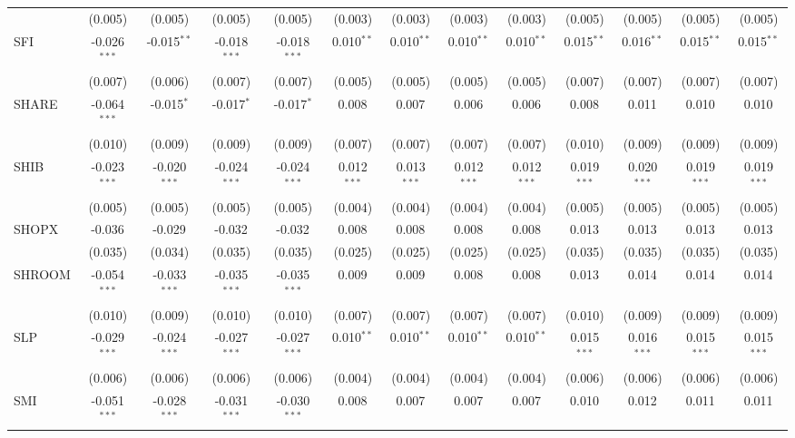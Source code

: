 \begin{table}[!htbp]
\begin{tabular}{@{\extracolsep{5pt}}lcccccccccccc}
  & (0.005) & (0.005) & (0.005) & (0.005) & (0.003) & (0.003) & (0.003) & (0.003) & (0.005) & (0.005) & (0.005) & (0.005) \\
 SFI & -0.026$^{***}$ & -0.015$^{**}$ & -0.018$^{***}$ & -0.018$^{***}$ & 0.010$^{**}$ & 0.010$^{**}$ & 0.010$^{**}$ & 0.010$^{**}$ & 0.015$^{**}$ & 0.016$^{**}$ & 0.015$^{**}$ & 0.015$^{**}$ \\
  & (0.007) & (0.006) & (0.007) & (0.007) & (0.005) & (0.005) & (0.005) & (0.005) & (0.007) & (0.007) & (0.007) & (0.007) \\
 SHARE & -0.064$^{***}$ & -0.015$^{*}$ & -0.017$^{*}$ & -0.017$^{*}$ & 0.008$^{}$ & 0.007$^{}$ & 0.006$^{}$ & 0.006$^{}$ & 0.008$^{}$ & 0.011$^{}$ & 0.010$^{}$ & 0.010$^{}$ \\
  & (0.010) & (0.009) & (0.009) & (0.009) & (0.007) & (0.007) & (0.007) & (0.007) & (0.010) & (0.009) & (0.009) & (0.009) \\
 SHIB & -0.023$^{***}$ & -0.020$^{***}$ & -0.024$^{***}$ & -0.024$^{***}$ & 0.012$^{***}$ & 0.013$^{***}$ & 0.012$^{***}$ & 0.012$^{***}$ & 0.019$^{***}$ & 0.020$^{***}$ & 0.019$^{***}$ & 0.019$^{***}$ \\
  & (0.005) & (0.005) & (0.005) & (0.005) & (0.004) & (0.004) & (0.004) & (0.004) & (0.005) & (0.005) & (0.005) & (0.005) \\
 SHOPX & -0.036$^{}$ & -0.029$^{}$ & -0.032$^{}$ & -0.032$^{}$ & 0.008$^{}$ & 0.008$^{}$ & 0.008$^{}$ & 0.008$^{}$ & 0.013$^{}$ & 0.013$^{}$ & 0.013$^{}$ & 0.013$^{}$ \\
  & (0.035) & (0.034) & (0.035) & (0.035) & (0.025) & (0.025) & (0.025) & (0.025) & (0.035) & (0.035) & (0.035) & (0.035) \\
 SHROOM & -0.054$^{***}$ & -0.033$^{***}$ & -0.035$^{***}$ & -0.035$^{***}$ & 0.009$^{}$ & 0.009$^{}$ & 0.008$^{}$ & 0.008$^{}$ & 0.013$^{}$ & 0.014$^{}$ & 0.014$^{}$ & 0.014$^{}$ \\
  & (0.010) & (0.009) & (0.010) & (0.010) & (0.007) & (0.007) & (0.007) & (0.007) & (0.010) & (0.009) & (0.009) & (0.009) \\
 SLP & -0.029$^{***}$ & -0.024$^{***}$ & -0.027$^{***}$ & -0.027$^{***}$ & 0.010$^{**}$ & 0.010$^{**}$ & 0.010$^{**}$ & 0.010$^{**}$ & 0.015$^{***}$ & 0.016$^{***}$ & 0.015$^{***}$ & 0.015$^{***}$ \\
  & (0.006) & (0.006) & (0.006) & (0.006) & (0.004) & (0.004) & (0.004) & (0.004) & (0.006) & (0.006) & (0.006) & (0.006) \\
 SMI & -0.051$^{***}$ & -0.028$^{***}$ & -0.031$^{***}$ & -0.030$^{***}$ & 0.008$^{}$ & 0.007$^{}$ & 0.007$^{}$ & 0.007$^{}$ & 0.010$^{}$ & 0.012$^{}$ & 0.011$^{}$ & 0.011$^{}$ \\

\end{tabular}
\end{table}
